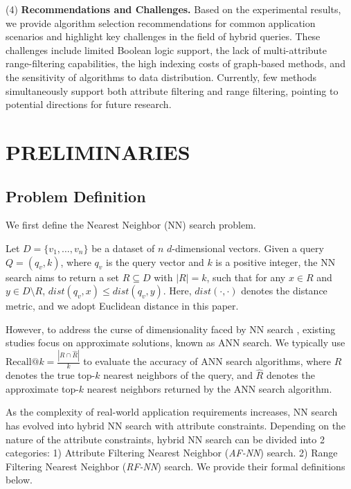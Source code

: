 \documentclass[sigconf, nonacm]{acmart}
\begin{document}
(4)\textbf{ Recommendations and Challenges.}
Based on the experimental results, we provide algorithm selection recommendations for common application scenarios and highlight key challenges in the field of hybrid queries. These challenges include limited Boolean logic support, the lack of multi-attribute range-filtering capabilities, the high indexing costs of graph-based methods, and the sensitivity of algorithms to data distribution. Currently, few methods simultaneously support both attribute filtering and range filtering, pointing to potential directions for future research.

\section{PRELIMINARIES}

\subsection{Problem Definition}

We first define the Nearest Neighbor (NN) search problem.

\begin{definition}[NN Search]

Let \( D = \{v_1, \ldots, v_n\} \) be a dataset of \( n \) \( d \)-dimensional vectors. Given a query \( Q = (q_v, k) \), where \( q_v \) is the query vector and \( k \) is a positive integer, the NN search aims to return a set \( R \subseteq D \) with \( |R| = k \), such that for any \( x \in R \) and \( y \in D \setminus R \), \( \textit{dist}\!\left(q_v, x\right) \leq \textit{dist}\!\left(q_v, y\right) \). Here, \( \textit{dist}\!\left(\cdot, \cdot\right) \) denotes the distance metric, and we adopt Euclidean distance in this paper.
\end{definition}

However, to address the curse of dimensionality faced by NN search \cite{dimcurse}, existing studies focus on approximate solutions, known as ANN  search. We typically use $\text{Recall}@k = \frac{|R \cap \hat{R}|}{k}$ to evaluate the accuracy of ANN search algorithms, where $R$ denotes the true top-$k$ nearest neighbors of the query, and $\hat{R}$ denotes the approximate top-$k$ nearest neighbors returned by the ANN search algorithm.

As the complexity of real-world application requirements increases, NN search has evolved into hybrid NN search with attribute constraints. Depending on the nature of the attribute constraints, hybrid NN search can be divided into 2 categories: 1) Attribute Filtering Nearest Neighbor (\textit{AF-NN}) search. 2) Range Filtering Nearest Neighbor (\textit{RF-NN}) search. We provide their formal definitions below.
\end{document}
